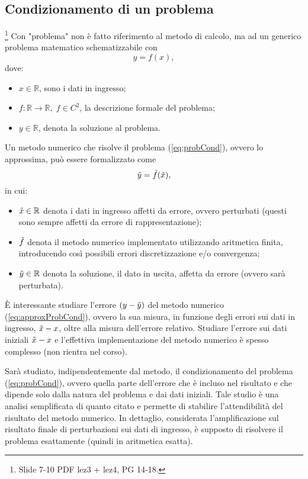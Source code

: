 \subsection{Condizionamento di un problema}\footnote{Slide 7-10 PDF lez3 + lez4, PG 14-18.}
Con "problema" non è fatto riferimento al metodo di calcolo, ma ad un generico problema matematico schematizzabile con 
\begin{equation}\label{eq:probCond}
    y=f(x),
\end{equation}
dove:
\begin{itemize}
    \item $x\in\mathbb R$, sono i dati in ingresso;
    \item $f:\mathbb R\rightarrow\mathbb R,\; f\in C^2$, la descrizione formale del problema;
    \item $y\in\mathbb R$, denota la soluzione al problema.
\end{itemize}

Un metodo numerico che risolve il problema (\ref{eq:probCond}), ovvero lo approssima, può essere formalizzato come
\begin{equation}\label{eq:approxProbCond}
    \Tilde{y}=\Tilde{f}(\Tilde{x}),
\end{equation}
in cui:
\begin{itemize}
    \item $\Tilde{x}\in\mathbb R$ denota i dati in ingresso affetti da errore, ovvero perturbati (questi sono sempre affetti da errore di rappresentazione);
    \item $\Tilde{f}$ denota il metodo numerico implementato utilizzando aritmetica finita, introducendo così possibili errori discretizzazione e/o convergenza;
    \item $\Tilde{y}\in\mathbb R$ denota la soluzione, il dato in uscita, affetta da errore (ovvero sarà perturbata). 
\end{itemize}

È interessante studiare l'errore $(y-\Tilde{y})$ del metodo numerico (\ref{eq:approxProbCond}), ovvero la sua misura, in funzione degli errori sui dati in ingresso, $\Tilde{x} - x$, oltre alla misura dell'errore relativo. Studiare l'errore sui dati iniziali $\Tilde{x} - x$ e l'effettiva implementazione del metodo numerico è spesso complesso (non rientra nel corso).

Sarà studiato, indipendentemente dal metodo, il condizionamento del problema (\ref{eq:probCond}), ovvero quella parte dell'errore che è incluso nel risultato e che dipende solo dalla natura del problema e dai dati iniziali. Tale studio è una analisi semplificata di quanto citato e permette di stabilire l'attendibilità del risultato del metodo numerico. In dettaglio, considerata l'amplificazione sul risultato finale di perturbazioni sui dati di ingresso, è supposto di risolvere il problema esattamente (quindi in aritmetica esatta).


